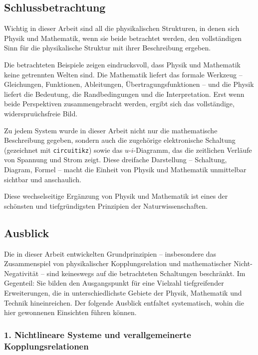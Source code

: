 ﻿\documentclass[12pt, a4paper]{article}
\begin{document}
	\subsection{Schlussbetrachtung}
	
	Wichtig in dieser Arbeit sind all die physikalischen Strukturen, in denen sich Physik und Mathematik, wenn sie beide betrachtet werden, den vollständigen Sinn für die physikalische Struktur mit ihrer Beschreibung ergeben.
	
	Die betrachteten Beispiele zeigen eindrucksvoll, dass Physik und Mathematik keine getrennten Welten sind. Die Mathematik liefert das formale Werkzeug -- Gleichungen, Funktionen, Ableitungen, Übertragungsfunktionen -- und die Physik liefert die Bedeutung, die Randbedingungen und die Interpretation. Erst wenn beide Perspektiven zusammengebracht werden, ergibt sich das vollständige, widerspruüchsfreie Bild.
	
	Zu jedem System wurde in dieser Arbeit nicht nur die mathematische Beschreibung gegeben, sondern auch die zugehörige elektronische Schaltung (gezeichnet mit \texttt{circuitikz}) sowie das $u$-$i$-Diagramm, das die zeitlichen Verläufe von Spannung und Strom zeigt. Diese dreifache Darstellung -- Schaltung, Diagram, Formel -- macht die Einheit von Physik und Mathematik unmittelbar sichtbar und anschaulich.
	
	Diese wechselseitige Ergänzung von Physik und Mathematik ist eines der schönsten und tiefgründigsten Prinzipien der Naturwissenschaften.

	\subsection{Ausblick}

	Die in dieser Arbeit entwickelten Grundprinzipien -- insbesondere das Zusammenspiel von physikalischer Kopplungsrelation und mathematischer Nicht-Negativität -- sind keineswegs auf die betrachteten Schaltungen beschränkt. Im Gegenteil: Sie bilden den Ausgangspunkt für eine Vielzahl tiefgreifender Erweiterungen, die in unterschiedlichste Gebiete der Physik, Mathematik und Technik hineinreichen. Der folgende Ausblick entfaltet systematisch, wohin die hier gewonnenen Einsichten führen können.

	\subsubsection*{1. \quad Nichtlineare Systeme und verallgemeinerte Kopplungsrelationen}
\end{document}
